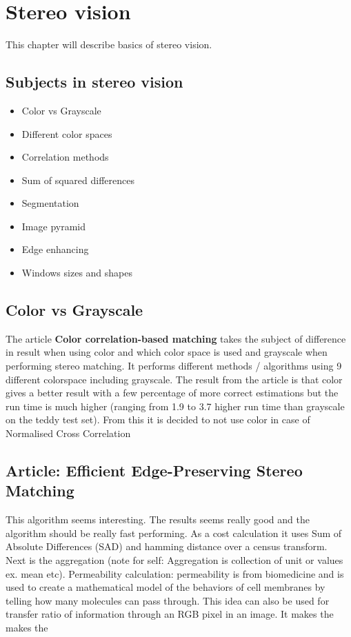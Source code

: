 \chapter{Stereo vision}
This chapter will describe basics of stereo vision.

\section{Subjects in stereo vision}

\begin{itemize}
\item Color vs Grayscale
\item Different color spaces
\item Correlation methods
\item Sum of squared differences
\item Segmentation
\item Image pyramid
\item Edge enhancing
\item Windows sizes and shapes
\end{itemize}

\section{Color vs Grayscale}
The article \textbf{Color correlation-based matching} takes the subject of difference in result when using color and which color space is used and grayscale when performing stereo matching. It performs different methods / algorithms using 9 different colorspace including grayscale. The result from the article is that color gives a better result with a few percentage of more correct estimations but the run time is much higher (ranging from 1.9 to 3.7 higher run time than grayscale on the teddy test set).
From this it is decided to not use color in case of Normalised Cross Correlation

\section{Article: Efficient Edge-Preserving Stereo Matching}
This algorithm seems interesting. The results seems really good and the algorithm should be really fast performing. As a cost calculation it uses Sum of Absolute Differences (SAD) and hamming distance over a census transform. \\
Next is the aggregation (note for self: Aggregation is collection of unit or values ex. mean etc). 
Permeability calculation: permeability is from biomedicine and is used to create a mathematical model of the behaviors of cell membranes by telling how many molecules can pass through. This idea can also be used for transfer ratio of information through an RGB pixel in an image. It makes the makes the 

